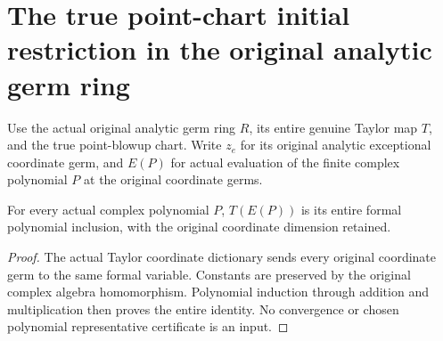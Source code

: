\section{The true point-chart initial restriction in the original analytic germ ring}

Use the actual original analytic germ ring $R$, its entire genuine Taylor
map $T$, and the true point-blowup chart. Write $z_e$ for its original
analytic exceptional coordinate germ, and $E(P)$ for actual evaluation of
the finite complex polynomial $P$ at the original coordinate germs.

\begin{lemma}
\label{hir:actual-unshifted-analytic-polynomial-taylor-inclusion}
\leanok
For every actual complex polynomial $P$, $T(E(P))$ is its entire formal
polynomial inclusion, with the original coordinate dimension retained.
\end{lemma}
\begin{proof}
The actual Taylor coordinate dictionary sends every original coordinate
germ to the same formal variable. Constants are preserved by the original
complex algebra homomorphism. Polynomial induction through addition and
multiplication then proves the entire identity. No convergence or chosen
polynomial representative certificate is an input.
\end{proof}

